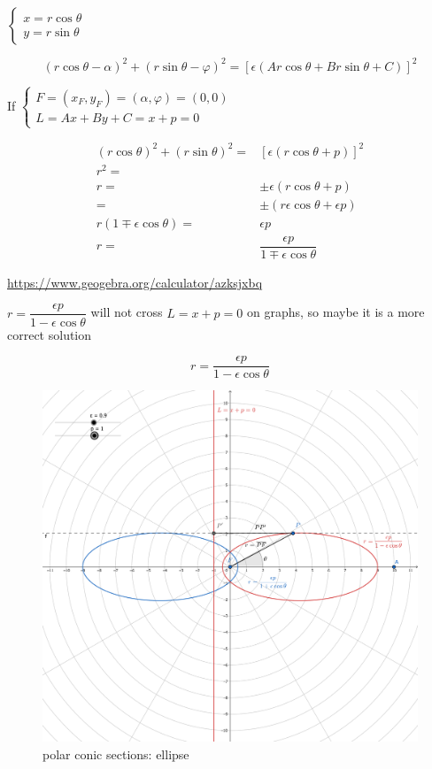 \documentclass[
]{book}
\theoremstyle{definition}
\theoremstyle{definition}
\theoremstyle{definition}
\theoremstyle{definition}
\theoremstyle{remark}
\begin{document}
\(\begin{cases}x=r\cos\theta\\y=r\sin\theta\end{cases}\)

\[
\left(r\cos\theta-\alpha\right)^{2}+\left(r\sin\theta-\varphi\right)^{2}=\left[\epsilon\left(Ar\cos\theta+Br\sin\theta+C\right)\right]^{2}
\]

If \(\begin{cases}F=\left(x_{{\scriptscriptstyle F}},y_{{\scriptscriptstyle F}}\right)=\left(\alpha,\varphi\right)=\left(0,0\right)\\L=Ax+By+C=x+p=0\end{cases}\)

\[
\begin{aligned}
\left(r\cos\theta\right)^{2}+\left(r\sin\theta\right)^{2}= & \left[\epsilon\left(r\cos\theta+p\right)\right]^{2}\\
r^{2}=\\
r= & \pm\epsilon\left(r\cos\theta+p\right)\\
= & \pm\left(r\epsilon\cos\theta+\epsilon p\right)\\
r\left(1\mp\epsilon\cos\theta\right)= & \epsilon p\\
r= & \dfrac{\epsilon p}{1\mp\epsilon\cos\theta}
\end{aligned}
\]

\url{https://www.geogebra.org/calculator/azksjxbq}

\(r=\dfrac{\epsilon p}{1-\epsilon\cos\theta}\) will not cross \(L=x+p=0\) on graphs, so maybe it is a more correct solution

\[
r=\dfrac{\epsilon p}{1-\epsilon\cos\theta}
\]

\begin{figure}
\includegraphics[width=0.75\linewidth]{img/conic-sections-polar-ellipse} \caption{polar conic sections: ellipse}\label{fig:unnamed-chunk-7}
\end{figure}
\end{document}
